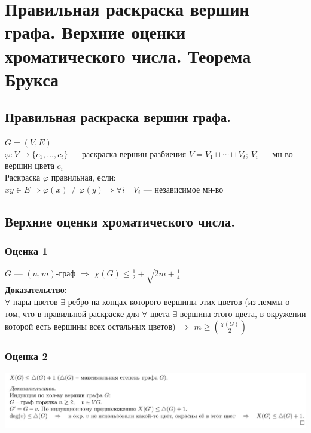 \documentclass[12pt]{article}
\begin{document}
\section{Правильная раскраска вершин графа. Верхние оценки хроматического числа. Теорема Брукса }
\subsection{Правильная раскраска вершин графа.}
	$G = (V,E)$\\
	$\varphi:V \to \{c_1,\dotsc,c_t\}$ — раскраска вершин разбиения $V = V_1 \sqcup \dotsb \sqcup V_t$; $V_i$ — мн-во вершин цвета $c_i$\\
	Раскраска $\varphi$ правильная, если:\\
	$xy \in E \Rightarrow \varphi(x) \neq \varphi(y) \Rightarrow \forall i \quad V_i$ — независимое мн-во
\subsection{Верхние оценки хроматического числа.}
\subsubsection{Оценка 1}
	$G$ — $(n,m)$-граф $\Rightarrow$ $\chi(G) \leqslant \frac{1}{2} + \sqrt{2m + \frac{1}{4}}$\\
	\textbf{Доказательство:}\\
		$\forall$ пары цветов $\exists$ ребро на концах которого вершины этих цветов (из леммы о том, что в правильной раскраске для $\forall$ цвета $\exists$ вершина этого цвета, в окружении которой есть вершины всех остальных цветов)	
		$\Rightarrow$ $m \geqslant \binom{\chi(G)}{2}$\\
	\qedsymbol
\subsubsection{Оценка 2}
	\includegraphics[width=550pt]{8}
\end{document}
